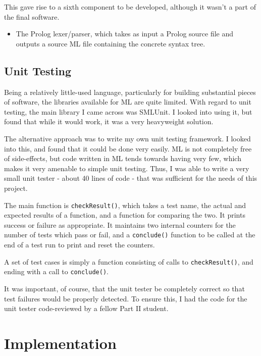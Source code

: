 \documentclass[12pt]{article}
\begin{document}
This gave rise to a sixth component to be developed, although it wasn't a part of the final software.

\begin{itemize}
\item The Prolog lexer/parser, which takes as input a Prolog source file and outputs a source ML file containing the concrete syntax tree.
\end{itemize}

\subsection{Unit Testing}

Being a relatively little-used language, particularly for building substantial pieces of software, the libraries available for ML are quite limited. 
With regard to unit testing, the main library I came across was SMLUnit. 
I looked into using it, but found that while it would work, it was a very heavyweight solution.

The alternative approach was to write my own unit testing framework. 
I looked into this, and found that it could be done very easily. 
ML is not completely free of side-effects, but code written in ML tends towards having very few, which makes it very amenable to simple unit testing. 
Thus, I was able to write a very small unit tester - about 40 lines of code - that was sufficient for the needs of this project.

The main function is \verb|checkResult()|, which takes a test name, the actual and expected results of a function, and a function for comparing the two. 
It prints success or failure as appropriate. 
It maintains two internal counters for the number of tests which pass or fail, and a \verb|conclude()| function to be called at the end of a test run to print and reset the counters.

A set of test cases is simply a function consisting of calls to \verb|checkResult()|, and ending with a call to \verb|conclude()|.

It was important, of course, that the unit tester be completely correct so that test failures would be properly detected. 
To ensure this, I had the code for the unit tester code-reviewed by a fellow Part II student.

\newpage

\section{Implementation}
\end{document}
